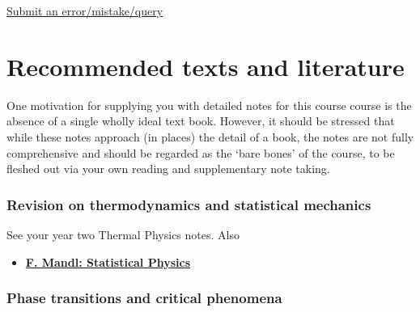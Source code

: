 \documentclass[
  letterpaper,
  DIV=11,
  numbers=noendperiod]{scrreprt}
\providecommand{\tightlist}{%
  \setlength{\itemsep}{0pt}\setlength{\parskip}{0pt}}\usepackage{longtable,booktabs,array}
\begin{document}
\begin{tcolorbox}[enhanced jigsaw, colframe=quarto-callout-note-color-frame, colback=white, breakable, rightrule=.15mm, arc=.35mm, leftrule=.75mm, bottomrule=.15mm, toprule=.15mm, left=2mm, opacityback=0]

\href{https://forms.office.com/e/YnWKHdiGjv}{Submit an
error/mistake/query}

\end{tcolorbox}


\chapter*{Recommended texts and literature}\label{literature}


One motivation for supplying you with detailed notes for this course
course is the absence of a single wholly ideal text book. However, it
should be stressed that while these notes approach (in places) the
detail of a book, the notes are not fully comprehensive and should be
regarded as the `bare bones' of the course, to be fleshed out via your
own reading and supplementary note taking.

\subsection*{Revision on thermodynamics and statistical
mechanics}\label{revision-on-thermodynamics-and-statistical-mechanics}

See your year two Thermal Physics notes. Also

\begin{itemize}
\tightlist
\item
  \textbf{\href{https://bris.on.worldcat.org/search/detail/15487191?queryString=F.\%20Mandl&clusterResults=true&stickyFacetsChecked=true&groupVariantRecords=false}{F.
  Mandl: Statistical Physics}}
\end{itemize}

\subsection*{Phase transitions and critical
phenomena}\label{phase-transitions-and-critical-phenomena}
\end{document}
